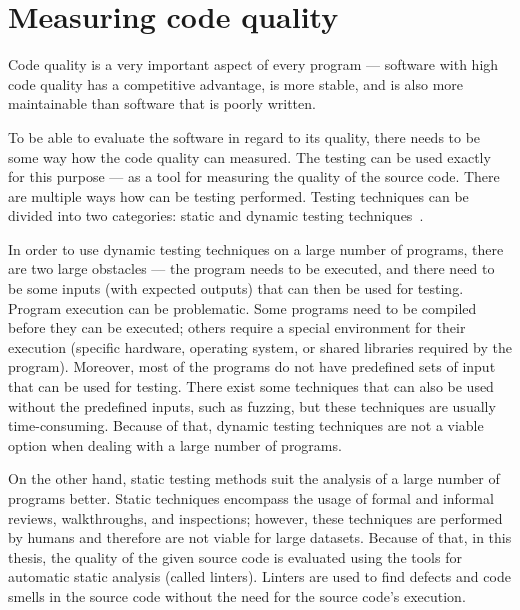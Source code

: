 \documentclass[digital,oneside,oldtable,nolof,nolot,nocover]{fithesis4}
\begin{document}
\section{Measuring code quality}
\label{sec:orgac6613a}
Code quality is a very important aspect of every program --- software with high
code quality has a competitive advantage, is more stable, and is also more
maintainable than software that is poorly written.

To be able to evaluate the software in regard to its quality, there needs to
be some way how the code quality can measured. The testing can be used exactly
for this purpose --- as a tool for measuring the quality of the source code.
There are multiple ways how can be testing performed. Testing techniques can
be divided into two categories: static and dynamic testing techniques~\cite{istqb}.

In order to use dynamic testing techniques on a large number of programs, there
are two large obstacles --- the program needs to be executed, and there need
to be some inputs (with expected outputs) that can then be used for testing.
Program execution can be problematic. Some programs need to be compiled
before they can be executed; others require a special environment for their
execution (specific hardware, operating system, or shared libraries required
by the program). Moreover, most of the programs do not have predefined sets of
input that can be used for testing. There exist some techniques that can also be
used without the predefined inputs, such as fuzzing, but these techniques
are usually time-consuming. Because of that, dynamic testing techniques are
not a viable option when dealing with a large number of programs.

On the other hand, static testing methods suit the analysis of a large
number of programs better. Static techniques encompass the usage of formal and
informal reviews, walkthroughs, and inspections; however, these techniques are
performed by humans and therefore are not viable for large datasets. Because
of that, in this thesis, the quality of the given source code is evaluated
using the tools for automatic static analysis (called linters). Linters are
used to find defects and code smells in the source code without the need for
the source code's execution.
\end{document}
